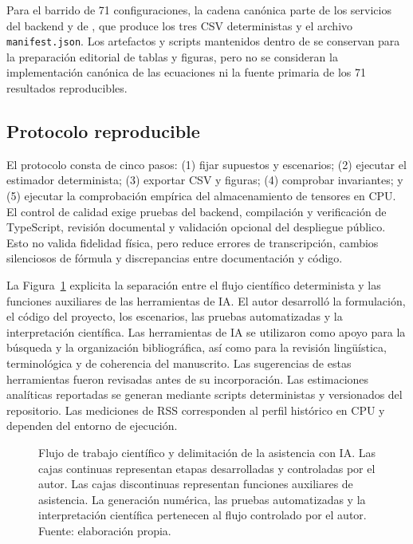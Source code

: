 \documentclass[a4paper,twocolumn]{article}
\begin{document}
Para el barrido de 71 configuraciones, la cadena canónica parte de los servicios del backend y de , que produce los tres CSV deterministas y el archivo \texttt{manifest.json}. Los artefactos y scripts mantenidos dentro de  se conservan para la preparación editorial de tablas y figuras, pero no se consideran la implementación canónica de las ecuaciones ni la fuente primaria de los 71 resultados reproducibles.

\subsection{Protocolo reproducible}
El protocolo consta de cinco pasos: (1) fijar supuestos y escenarios; (2) ejecutar el estimador determinista; (3) exportar CSV y figuras; (4) comprobar invariantes; y (5) ejecutar la comprobación empírica del almacenamiento de tensores en CPU. El control de calidad exige pruebas del backend, compilación y verificación de TypeScript, revisión documental y validación opcional del despliegue público. Esto no valida fidelidad física, pero reduce errores de transcripción, cambios silenciosos de fórmula y discrepancias entre documentación y código.


La Figura~\ref{fig:flujo-ia} explicita la separación entre el flujo científico
determinista y las funciones auxiliares de las herramientas de IA. El autor
desarrolló la formulación, el código del proyecto, los escenarios, las pruebas
automatizadas y la interpretación científica. Las herramientas de IA se utilizaron como apoyo para la búsqueda y la organización bibliográfica,
así como para la revisión lingüística, terminológica y de coherencia del
manuscrito. Las sugerencias de estas herramientas fueron revisadas antes de su
incorporación. Las estimaciones analíticas reportadas se generan mediante scripts deterministas y versionados del repositorio. Las mediciones de RSS corresponden al perfil histórico en CPU y dependen del entorno de ejecución.

\begin{figure}[!t]
\centering

\caption{Flujo de trabajo científico y delimitación de la asistencia con IA.
Las cajas continuas representan etapas desarrolladas y controladas por el
autor. Las cajas discontinuas representan funciones auxiliares de asistencia.
La generación numérica, las pruebas automatizadas y la interpretación
científica pertenecen al flujo controlado por el autor. Fuente: elaboración
propia.}
\label{fig:flujo-ia}
\end{figure}
\end{document}
